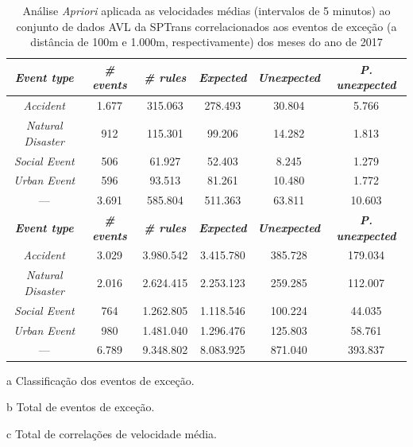 \documentclass[
	12pt,				%
	oneside,			%
	a4paper,			%
	english,			%
	brazil				%
	]{abntex2ppgsi}
\begin{document}
{{\begin{table}[!htb]
\centering
\begin{threeparttable}
\caption {Análise \textit{Apriori} aplicada as velocidades médias (intervalos de 5 minutos) ao conjunto de dados AVL da SPTrans correlacionados aos eventos de exceção (a distância de 100m e 1.000m, respectivamente) dos meses do ano de 2017}
\label {tab:aprioriFull}
\begin{tabular}{c|c|c|c|c|c}
\toprule
\textbf{\textit{Event type}}\tnote{a} & \textbf{\textit{\# events}}\tnote{b} & \textit{\textbf{\# rules}}\tnote{c} & \textbf{\textit{Expected}}\tnote{d} & \textbf{\textit{Unexpected}}\tnote{e} & \textbf{\textit{P. unexpected}}\tnote{f}   \\
\midrule
\textit{Accident} & 1.677 & 315.063 & 278.493 & 30.804 & 5.766 \\
\hline
\textit{Natural Disaster} & 912 & 115.301 & 99.206 & 14.282 & 1.813 \\
\hline
\textit{Social Event} & 506 & 61.927 & 52.403 & 8.245 & 1.279 \\
\hline
\textit{Urban Event} & 596 & 93.513 & 81.261 & 10.480 & 1.772 \\
\midrule
{---} & 3.691 & 585.804 & 511.363 & 63.811 & 10.603 \\
\bottomrule
\toprule
\textbf{\textit{Event type}}\tnote{a} & \textbf{\textit{\# events}}\tnote{b} & \textit{\textbf{\# rules}}\tnote{c} & \textbf{\textit{Expected}}\tnote{d} & \textbf{\textit{Unexpected}}\tnote{e} & \textbf{\textit{P. unexpected}}\tnote{f}   \\
\midrule
\textit{Accident} & 3.029 & 3.980.542 & 3.415.780 & 385.728 & 179.034 \\
\textit{Natural Disaster} & 2.016 & 2.624.415 & 2.253.123 & 259.285 & 112.007 \\
\textit{Social Event} & 764 & 1.262.805 & 1.118.546 & 100.224 & 44.035 \\
\textit{Urban Event} & 980 & 1.481.040 & 1.296.476 & 125.803 & 58.761 \\
\midrule
{---} & 6.789 & 9.348.802 & 8.083.925 & 871.040 & 393.837 \\
\bottomrule
\end{tabular}
\begin{tablenotes}
            \item[a] Classificação dos eventos de exceção.
            \item[b] Total de eventos de exceção.
            \item[c] Total de correlações de velocidade média.

\end{tablenotes}
\end{threeparttable}
\end{table}}}
\end{document}
